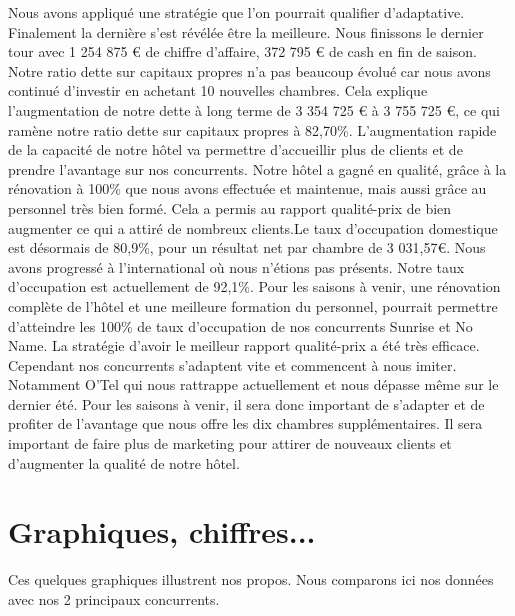 \documentclass[a4paper,10pt]{article}
\begin{document}
  Nous avons appliqué une stratégie que l’on pourrait qualifier d’adaptative.
  Finalement la dernière s’est révélée être la meilleure. Nous finissons le dernier tour
  avec 1 254 875 \euro{} de chiffre d’affaire, 372 795 \euro{} de cash en fin de saison.
  Notre ratio dette sur capitaux propres n’a pas beaucoup évolué car nous avons continué
  d’investir en achetant 10 nouvelles chambres. Cela explique l’augmentation de notre
  dette à long terme de 3 354 725 \euro{} à 3 755 725 \euro{}, ce qui ramène notre ratio
  dette sur capitaux propres à 82,70\%. L’augmentation rapide de la capacité de notre hôtel
  va permettre d’accueillir plus de clients et de prendre l’avantage sur nos concurrents.
  \newline
  \newline
  Notre hôtel a gagné en qualité, grâce à la rénovation à 100\%
  que nous avons effectuée et maintenue, mais aussi grâce au personnel
  très bien formé. Cela a permis au rapport qualité-prix de bien augmenter
  ce qui a attiré de nombreux clients.Le taux d’occupation domestique est désormais
  de 80,9\%, pour un résultat net par chambre de 3 031,57\euro{}.
  \newline
  \newline
  Nous avons progressé à l’international où nous n’étions pas présents.
  Notre taux d’occupation est actuellement de 92,1\%.
  Pour les saisons à venir, une rénovation complète de l’hôtel et une meilleure formation du personnel,
  pourrait permettre d’atteindre les 100\% de taux d’occupation de nos concurrents Sunrise et No Name. 
  \newline
  \newline
  La stratégie d’avoir le meilleur rapport qualité-prix a été très efficace.
  Cependant nos concurrents s’adaptent vite et commencent à nous imiter.
  Notamment O’Tel qui nous rattrappe actuellement et nous dépasse même
  sur le dernier été. Pour les saisons à venir, il sera donc important de s’adapter et de profiter
  de l’avantage que nous offre les dix chambres supplémentaires. Il sera important de faire plus de
  marketing pour attirer de nouveaux clients et d’augmenter la qualité de notre hôtel.


  \newpage
  \section{Graphiques, chiffres...}
    Ces quelques graphiques illustrent nos propos. Nous comparons ici nos données avec nos 2 principaux concurrents.
    \newline
        
\end{document}

